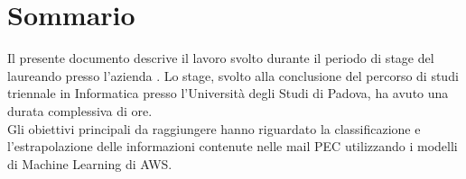 \cleardoublepage
{}
{}
\begingroup
\let\clearpage\relax
\let\cleardoublepage\relax

\chapter*{Sommario}

Il presente documento descrive il lavoro svolto durante il periodo di stage del laureando \myName presso l'azienda \myCompany. Lo stage, svolto alla conclusione del percorso di studi triennale in Informatica presso l'Università degli Studi di Padova, ha avuto una durata complessiva di \myHours ore. \\
Gli obiettivi principali da raggiungere hanno riguardato la classificazione e l'estrapolazione delle informazioni contenute nelle mail PEC utilizzando i modelli di Machine Learning di AWS.

\endgroup
\vfill
